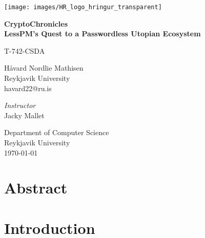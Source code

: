 \documentclass[twocolumn]{article}
\title{\titleHeading}
\author{Håvard Nordlie Mathisen}
\date{January, 2023}
\newcommand{\jacky}{Jacky Mallet}
\newcommand{\secu}{T-742-CSDA}
\newcommand{\titleHeading}{CryptoChronicles}
\newcommand{\titleSubheading}{LessPM's Quest to a Passwordless Utopian Ecosystem}
\newcommand{\subjectName}{\secu}
\newcommand{\instructorName}{\jacky}
\begin{document}
    \begin{titlepage}
        \begin{center}
            \texttt{[image: images/HR\_logo\_hringur\_transparent]}

            \huge
            \textbf{\titleHeading}\\
            \Large
            \textbf{\titleSubheading}

            \vspace{1cm}
            \large
            \subjectName

            \vspace{0.5cm}
            \Large
            Håvard Nordlie Mathisen\\
            \large
            Reykjavik University\\
            havard22@ru.is


            \vfill

            \normalsize
            \textit{Instructor}\\
            \instructorName

            \vspace{0.8cm}

            Department of Computer Science\\
            Reykjavik University\\
            \today\\

        \end{center}
    \end{titlepage}

    \begin{titlepage}
        \tableofcontents
    \end{titlepage}


    \section*{Abstract}\label{sec:abstract}
    

    \section{Introduction}\label{sec:introduction}
    
\end{document}
